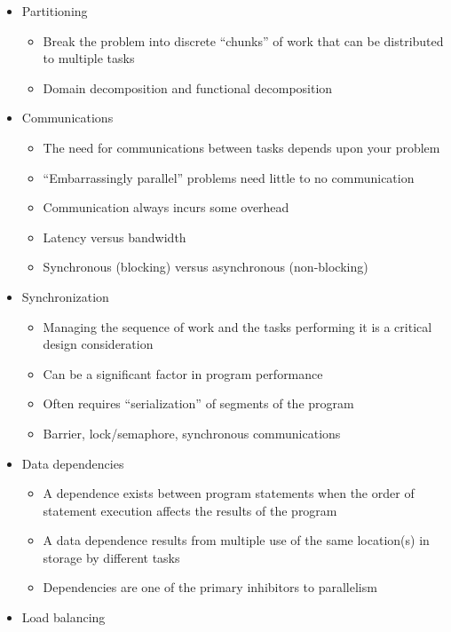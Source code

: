 \documentclass[12pt]{article}
\begin{document}
\begin{itemize}
\item Partitioning
      \begin{itemize}
      \item Break the problem into discrete ``chunks'' of work that can be
            distributed to multiple tasks
      \item Domain decomposition and functional decomposition
      \end{itemize}
\item Communications
      \begin{itemize}
      \item The need for communications between tasks depends upon your problem
      \item ``Embarrassingly parallel'' problems need little to no
            communication
      \item Communication always incurs some overhead
      \item Latency versus bandwidth
      \item Synchronous (blocking) versus asynchronous (non-blocking)
      \end{itemize}
\item Synchronization
      \begin{itemize}
      \item Managing the sequence of work and the tasks performing it is a
            critical design consideration
      \item Can be a significant factor in program performance
      \item Often requires ``serialization'' of segments of the program
      \item Barrier, lock/semaphore, synchronous communications
      \end{itemize}
\item Data dependencies
      \begin{itemize}
      \item A dependence exists between program statements when the order of
            statement execution affects the results of the program
      \item A data dependence results from multiple use of the same location(s)
            in storage by different tasks
      \item Dependencies are one of the primary inhibitors to parallelism
      \end{itemize}
\item Load balancing
      \begin{itemize}

\end{itemize}
\end{itemize}
\end{document}
